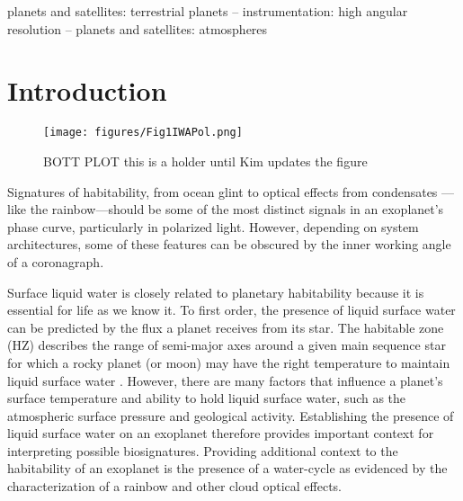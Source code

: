 \documentclass[
    usenatbib,
]{mnras}
\begin{document}
\begin{keywords}
planets and satellites: terrestrial planets -- 
instrumentation: high angular resolution -- 
planets and satellites: atmospheres
\end{keywords}


\section{Introduction}
\label{sec:intro}

\begin{figure*}%
   \centering
   \texttt{[image: figures/Fig1IWAPol.png]}
   \caption{BOTT PLOT this is a holder until Kim updates the figure}
    \label{fig:bottplot}
\end{figure*}

Signatures of habitability, from ocean glint to optical effects from condensates --- like the rainbow---should be some of the most distinct signals in an exoplanet's phase curve, particularly in polarized light.
%
However, depending on system architectures, some of these features can be obscured by the inner working angle of a coronagraph.

Surface liquid water is closely related to planetary habitability because it is essential for life as we know it.
%
To first order, the presence of liquid surface water can be predicted by the flux a planet receives from its star.
%
The habitable zone (HZ) describes the range of semi-major axes around a given main sequence star for which a rocky planet (or moon) may have the right temperature to maintain liquid surface water \citep{kasting93}. 
%
However, there are many factors that influence a planet's surface temperature and ability to hold liquid surface water, such as the atmospheric surface pressure and geological activity. 
%
Establishing the presence of liquid surface water on an exoplanet therefore provides important context for interpreting possible biosignatures.
%
Providing additional context to the habitability of an exoplanet is the presence of a water-cycle as evidenced by the characterization of a rainbow and other cloud optical effects. 

\end{document}
